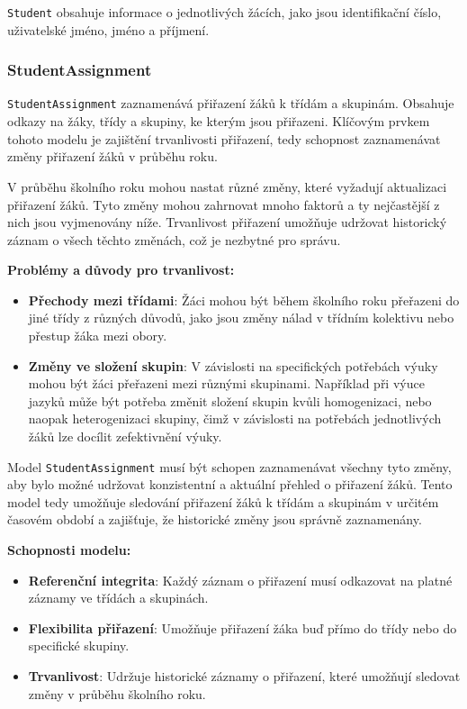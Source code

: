 \texttt{Student} obsahuje informace o jednotlivých žácích, jako jsou identifikační číslo, uživatelské jméno, jméno a příjmení.

\subsubsection*{StudentAssignment}

\texttt{StudentAssignment} zaznamenává přiřazení žáků k třídám a skupinám. Obsahuje odkazy na žáky, třídy a skupiny, ke kterým jsou přiřazeni. Klíčovým prvkem tohoto modelu je zajištění trvanlivosti přiřazení, tedy schopnost zaznamenávat změny přiřazení žáků v průběhu roku. 

V průběhu školního roku mohou nastat různé změny, které vyžadují aktualizaci přiřazení žáků. Tyto změny mohou zahrnovat mnoho faktorů a ty nejčastější z nich jsou vyjmenovány níže. Trvanlivost přiřazení umožňuje udržovat historický záznam o všech těchto změnách, což je nezbytné pro správu.

\textbf{Problémy a důvody pro trvanlivost:}

\begin{itemize}
    \item \textbf{Přechody mezi třídami}: Žáci mohou být během školního roku přeřazeni do jiné třídy z různých důvodů, jako jsou změny nálad v třídním kolektivu nebo přestup žáka mezi obory.
    \item \textbf{Změny ve složení skupin}: V závislosti na specifických potřebách výuky mohou být žáci přeřazeni mezi různými skupinami. Například při výuce jazyků může být potřeba změnit složení skupin kvůli homogenizaci, nebo naopak heterogenizaci skupiny, čimž v závislosti na potřebách jednotlivých žáků lze docílit zefektivnění výuky.
\end{itemize}

Model \texttt{StudentAssignment} musí být schopen zaznamenávat všechny tyto změny, aby bylo možné udržovat konzistentní a aktuální přehled o přiřazení žáků. Tento model tedy umožňuje sledování přiřazení žáků k třídám a skupinám v určitém časovém období a zajišťuje, že historické změny jsou správně zaznamenány.

\textbf{Schopnosti modelu:}

\begin{itemize}
    \item \textbf{Referenční integrita}: Každý záznam o přiřazení musí odkazovat na platné záznamy ve třídách a skupinách.
    \item \textbf{Flexibilita přiřazení}: Umožňuje přiřazení žáka buď přímo do třídy nebo do specifické skupiny.
    \item \textbf{Trvanlivost}: Udržuje historické záznamy o přiřazení, které umožňují sledovat změny v průběhu školního roku.
\end{itemize}

